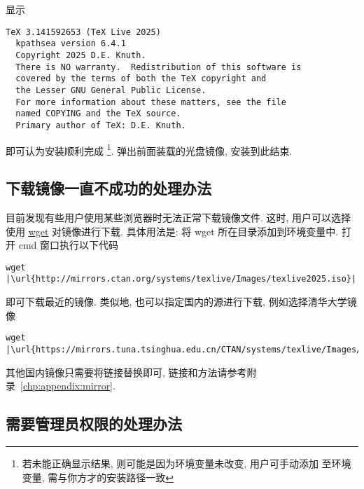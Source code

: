 显示
\begin{lstlisting}[language = {}]
  TeX 3.141592653 (TeX Live 2025)
  kpathsea version 6.4.1
  Copyright 2025 D.E. Knuth.
  There is NO warranty.  Redistribution of this software is
  covered by the terms of both the TeX copyright and
  the Lesser GNU General Public License.
  For more information about these matters, see the file
  named COPYING and the TeX source.
  Primary author of TeX: D.E. Knuth.
\end{lstlisting}
即可认为安装顺利完成%
\footnote{若未能正确显示结果, 则可能是因为环境变量未改变,
用户可手动添加  至环境变量,
 需与你方才的安装路径一致}.
弹出前面装载的光盘镜像,
安装到此结束.

\subsection{下载镜像一直不成功的处理办法}

目前发现有些用户使用某些浏览器时无法正常下载镜像文件.
这时,
用户可以选择使用 \href{https://eternallybored.org/misc/wget/}{\textsf{wget}} 对镜像进行下载.
具体用法是:
将 \textsf{wget} 所在目录添加到环境变量中.
打开 \textsf{cmd} 窗口执行以下代码
\begin{lstlisting}[escapechar = |]
  wget |\url{http://mirrors.ctan.org/systems/texlive/Images/texlive2025.iso}|
\end{lstlisting}
即可下载最近的镜像.
类似地,
也可以指定国内的源进行下载,
例如选择清华大学镜像
\begin{lstlisting}[escapechar = |]
  wget |\url{https://mirrors.tuna.tsinghua.edu.cn/CTAN/systems/texlive/Images/texlive2025.iso}|
\end{lstlisting}
其他国内镜像只需要将链接替换即可,
链接和方法请参考附录~\ref{chp:appendix:mirror}.

\subsection{需要管理员权限的处理办法}

